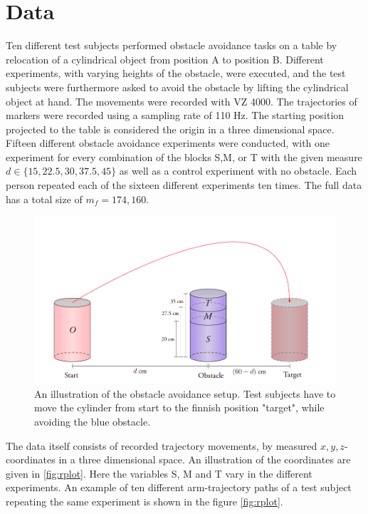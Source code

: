 \documentclass[11pt, fleqn, titlepage]{article}
\begin{document}
\section{Data}
Ten different test subjects performed obstacle avoidance tasks on a table by relocation of a cylindrical object from position A to position B. Different experiments, with varying heights of the obstacle, were executed, and the test subjects were furthermore asked to avoid the obstacle by lifting the cylindrical object at hand. The movements were recorded with VZ 4000. The trajectories of markers were recorded using a sampling rate of 110 Hz. The starting position projected to the table is considered the origin in a three dimensional space. Fifteen different obstacle avoidance experiments were conducted, with one experiment for every combination of the blocks S,M, or T with the given measure $ d \in \{15, 22.5,  30, 37.5, 45\} $ as well as a control experiment with no obstacle. Each person repeated each of the sixteen different experiments ten times. The full data has a total size of $ m_f = 174,160 $. \cite{armdata}
\begin{figure}[H]
	\centering
	\includegraphics[width=0.5\linewidth]{billeder/exp_pic.png}
	\caption{An illustration of the obstacle avoidance setup. Test subjects have to move the cylinder from start to the finnish position "target", while avoiding the blue obstacle.}
	\label{fig:exppic}
\end{figure} \noindent
The data itself consists of recorded trajectory movements, by measured $ x,y,z $-coordinates in a three dimensional space. An illustration of the coordinates are given in \ref{fig:rplot}. Here the variables S, M and T vary in the different experiments. An example of ten different arm-trajectory paths of a test subject repeating the same experiment is shown in the figure \ref{fig:rplot}.
\end{document}
